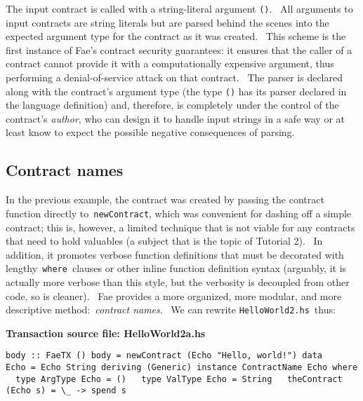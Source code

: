 \documentclass[11pt]{article}
\newcommand{\codeblock}[1]{\begin{mdframed}[
    backgroundcolor=header-color,
    linecolor=header-color,
    innertopmargin=10pt,
    ]{\texttt{#1}}\end{mdframed}}
\begin{document}
The input contract is called with a string-literal argument \texttt{()}.  All arguments to input contracts are string literals but are parsed behind the scenes into the expected argument type for the contract as it was created.  This scheme is the first instance of Fae's contract security guarantees: it ensures that the caller of a contract cannot provide it with a computationally expensive argument, thus performing a denial-of-service attack on that contract.  The parser is declared along with the contract's argument type (the type \texttt{()} has its parser declared in the language definition) and, therefore, is completely under the control of the contract's \textit{author}, who can design it to handle input strings in a safe way or at least know to expect the possible negative consequences of parsing.

\subsection{Contract names}
\vspace{5.5pt}

In the previous example, the contract was created by passing the contract function directly to \texttt{newContract}, which was convenient for dashing off a simple contract; this is, however, a limited technique that is not viable for any contracts that need to hold valuables (a subject that is the topic of Tutorial 2).  In addition, it promotes verbose function definitions that must be decorated with lengthy \texttt{where} clauses or other inline function definition syntax (arguably, it is actually more verbose than this style, but the verbosity is decoupled from other code, so is cleaner).  Fae provides a more organized, more modular, and more descriptive method: \textit{contract names}.  We can rewrite \texttt{HelloWorld2.hs} thus:


\vspace{11pt}

\textbf{Transaction source file: HelloWorld2a.hs}

\codeblock{body :: FaeTX ()\newline
body = newContract (Echo "Hello, world!")\newline
\newline
data Echo = Echo String deriving (Generic)\newline
\newline
instance ContractName Echo where\newline
  type ArgType Echo = ()\newline
  type ValType Echo = String\newline
  theContract (Echo s) = \textbackslash{}\_ -\textgreater{} spend s}
\end{document}

